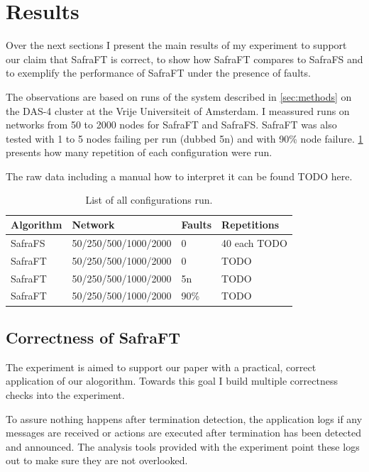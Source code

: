 \section{Results}
\label{sec:results}
Over the next sections I present the main results of my experiment to support our claim that SafraFT is correct, to show how SafraFT compares to SafraFS and to exemplify the performance of SafraFT under the presence of faults.

The observations are based on runs of the system described in \cref{sec:methods} on the DAS-4 cluster at the Vrije Universiteit of Amsterdam.
I meassured runs on networks from 50 to 2000 nodes for SafraFT and SafraFS.
SafraFT was also tested with 1 to 5 nodes failing per run (dubbed 5n) and with 90\% node failure.
\cref{table:runs} presents how many repetition of each configuration were run.

The raw data including a manual how to interpret it can be found TODO here.
\begin{table}[]
	\centering
	\begin{tabular}{@{}llll@{}}
		\toprule
		Algorithm & Network              & Faults & Repetitions  \\ \midrule
		SafraFS   & 50/250/500/1000/2000 & 0      & 40 each TODO \\
		SafraFT   & 50/250/500/1000/2000 & 0      & TODO         \\
		SafraFT   & 50/250/500/1000/2000 & 5n     & TODO         \\
		SafraFT   & 50/250/500/1000/2000 & 90\%   & TODO         \\ \bottomrule
	\end{tabular}
	\caption{List of all configurations run.}
	\label{table:runs}
\end{table}

\subsection{Correctness of SafraFT}
\label{ssec:correctness}
The experiment is aimed to support our paper with a practical, correct application of our alogorithm.
Towards this goal I build multiple correctness checks into the experiment. 

To assure nothing happens after termination detection, the application logs if any messages are received or actions are executed after termination has been detected and announced. 
The analysis tools provided with the experiment point these logs out to make sure they are not overlooked.

